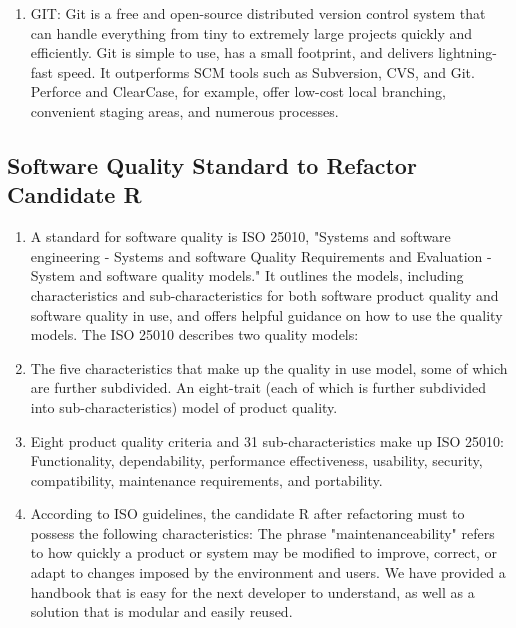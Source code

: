 \documentclass[12pt,english]{article}
\begin{document}
\begin{enumerate}
            \item GIT: Git is a free and open-source distributed version control system that can handle everything from tiny to extremely large projects quickly and efficiently. Git is simple to use, has a small footprint, and delivers lightning-fast speed. It outperforms SCM tools such as Subversion, CVS, and Git. Perforce and ClearCase, for example, offer low-cost local branching, convenient staging areas, and numerous processes.



        \end{enumerate}
\newpage        
 \subsection{ Software Quality Standard to Refactor Candidate R}
 \begin{enumerate}
 
    \begin{figure}[h!]
        \centering
        \texttt{[image: iso25010.png]}
        \caption{ISO/IEC 25010:2011-Software Quality Requirements and Evaluation}
    \end{figure}
    
            \item A standard for software quality is ISO 25010, "Systems and software engineering - Systems and software Quality Requirements and Evaluation - System and software quality models."
            It outlines the models, including characteristics and sub-characteristics for both software product quality and software quality in use, and offers helpful guidance on how to use the quality models. The ISO 25010 describes two quality models:


            \item The five characteristics that make up the quality in use model, some of which are further subdivided.
            An eight-trait (each of which is further subdivided into sub-characteristics) model of product quality.


            \item Eight product quality criteria and 31 sub-characteristics make up ISO 25010: Functionality, dependability, performance effectiveness, usability, security, compatibility, maintenance requirements, and portability.

            \item According to ISO guidelines, the candidate R after refactoring must to possess the following characteristics:
            The phrase "maintenanceability" refers to how quickly a product or system may be modified to improve, correct, or adapt to changes imposed by the environment and users. We have provided a handbook that is easy for the next developer to understand, as well as a solution that is modular and easily reused.



        \end{enumerate}
\newpage
\end{document}
